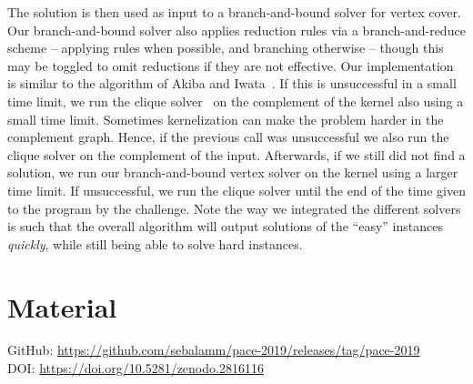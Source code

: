\documentclass[a4paper,UKenglish]{lipics-v2016}
\begin{document}
The solution is then used as input to a branch-and-bound solver for vertex cover. Our branch-and-bound solver also applies reduction rules via a branch-and-reduce scheme -- applying rules when possible, and branching otherwise -- though this may be toggled to omit reductions if they are not effective.
Our implementation is similar to the algorithm of Akiba and Iwata~\cite{akiba-tcs-2016}. If this is unsuccessful in a small time limit, we run the clique solver~\cite{DBLP:journals/cor/LiJM17} on the complement of the kernel also using a small time limit. Sometimes kernelization can make the problem harder in the complement graph. Hence, if the previous call was unsuccessful we also run the clique solver on the complement of the input. Afterwards, if we still did not find a solution, we run our branch-and-bound vertex solver on the kernel using a larger time limit. If unsuccessful, we run the clique solver until the end of the time given to the program by the challenge. Note the way we integrated the different solvers is such that the overall algorithm will output solutions of the ``easy'' instances \emph{quickly}, while still being able to solve hard instances.
\section{Material}
GitHub: \url{https://github.com/sebalamm/pace-2019/releases/tag/pace-2019} \\
DOI: \url{https://doi.org/10.5281/zenodo.2816116}


\end{document}
